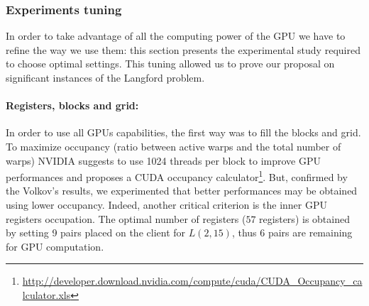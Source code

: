 
\subsubsection{Experiments tuning}

In order to take advantage of all the computing power of the GPU we have to refine the way we use them: this section presents the experimental study required to choose optimal settings. This tuning allowed us to prove our proposal on significant instances of the Langford problem.

\paragraph{Registers, blocks and grid: }

In order to use all GPUs capabilities, the first way was to fill the blocks and grid. To maximize occupancy (ratio between active warps and the total number of warps) NVIDIA suggests to use 1024 threads per block to improve GPU performances and proposes a CUDA occupancy calculator\footnote{\url{http://developer.download.nvidia.com/compute/cuda/CUDA_Occupancy_calculator.xls}}. But, confirmed by the Volkov's results\cite{Volkov}, we experimented that better performances may be obtained using lower occupancy. Indeed, another critical criterion is the inner GPU registers occupation. 
The optimal number of registers ($57$ registers) is obtained by setting 9 pairs placed on the client for $L(2,15)$, thus 6 pairs are remaining for GPU computation.


